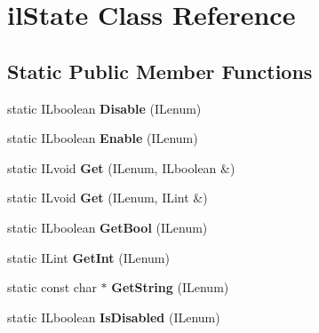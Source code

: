 \hypertarget{classil_state}{\section{il\+State Class Reference}
\label{classil_state}
}
\subsection*{Static Public Member Functions}
\begin{DoxyCompactItemize}
\item 
\hypertarget{classil_state_a268fd74c2e136371f87ff9b274e2d624}{static I\+Lboolean {\bfseries Disable} (I\+Lenum)}\label{classil_state_a268fd74c2e136371f87ff9b274e2d624}

\item 
\hypertarget{classil_state_a36430dec38f2372a2691b39173552d46}{static I\+Lboolean {\bfseries Enable} (I\+Lenum)}\label{classil_state_a36430dec38f2372a2691b39173552d46}

\item 
\hypertarget{classil_state_ab79dce3bb0b4f3493f6aa3da32729dc7}{static I\+Lvoid {\bfseries Get} (I\+Lenum, I\+Lboolean \&)}\label{classil_state_ab79dce3bb0b4f3493f6aa3da32729dc7}

\item 
\hypertarget{classil_state_acd122a01adf3d2bafd1c83ea2e02824c}{static I\+Lvoid {\bfseries Get} (I\+Lenum, I\+Lint \&)}\label{classil_state_acd122a01adf3d2bafd1c83ea2e02824c}

\item 
\hypertarget{classil_state_aca8a4b62a2d7c6fdab01651c4406185e}{static I\+Lboolean {\bfseries Get\+Bool} (I\+Lenum)}\label{classil_state_aca8a4b62a2d7c6fdab01651c4406185e}

\item 
\hypertarget{classil_state_a1ef08250ebc59d85be7ac76bff1984ae}{static I\+Lint {\bfseries Get\+Int} (I\+Lenum)}\label{classil_state_a1ef08250ebc59d85be7ac76bff1984ae}

\item 
\hypertarget{classil_state_ab329213345ecd03ae6b5596a321ad12e}{static const char $\ast$ {\bfseries Get\+String} (I\+Lenum)}\label{classil_state_ab329213345ecd03ae6b5596a321ad12e}

\item 
\hypertarget{classil_state_ab781af41cf8e62172e227f54863dddd4}{static I\+Lboolean {\bfseries Is\+Disabled} (I\+Lenum)}\label{classil_state_ab781af41cf8e62172e227f54863dddd4}


\end{DoxyCompactItemize}

